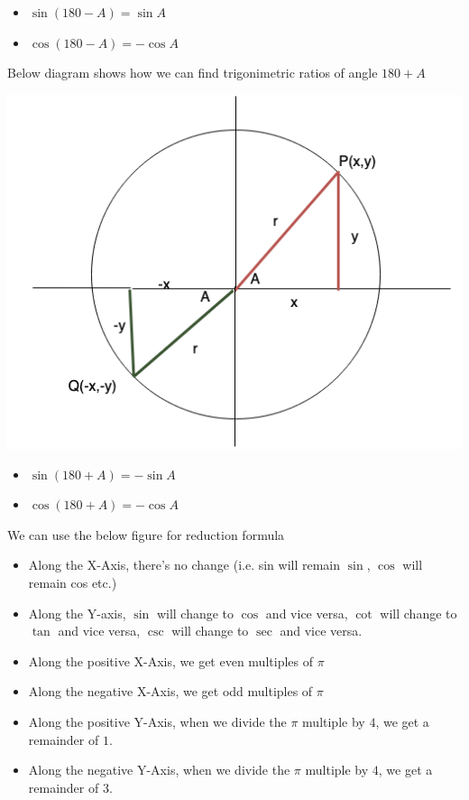 \documentclass{book}
\begin{document}
		\begin{mdframed}[backgroundcolor=yellow]
			\begin{itemize}
				\item$\sin(180-A) = \sin{A}$
				\item $\cos(180-A) = -\cos{A}$
				
			\end{itemize}
		\end{mdframed}
		
	Below diagram shows how we can find trigonimetric ratios of angle $180+A$
	
	\includegraphics[scale=0.6]{180ptheta}
	
	\begin{mdframed}[backgroundcolor=yellow]
		\begin{itemize}
			\item$\sin(180+A) = -\sin{A}$
			\item $\cos(180+A) = -\cos{A}$
			
		\end{itemize}
	\end{mdframed}
	
	
	We can use the below figure for reduction formula 
	\begin{itemize}
		\item Along the X-Axis, there's no change (i.e. sin will remain $\sin$, $\cos$ will remain cos etc.)
		\item Along the Y-axis, $\sin$ will change to $\cos$ and vice versa, $\cot$ will change to $\tan$ and vice versa, $\csc$ will change to $\sec$ and vice versa.
		\item Along the positive X-Axis, we get even multiples of $\pi$
		\item Along the negative X-Axis, we get odd multiples of $\pi$
		\item Along the positive Y-Axis, when we divide the $\pi$ multiple by $4$, we get a remainder of $1$.
		\item Along the negative Y-Axis, when we divide the $\pi$ multiple by $4$, we get a remainder of $3$.
	\end{itemize}
	
\end{document}

